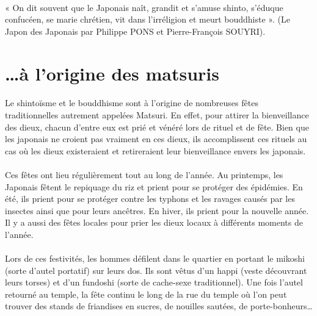 \paragraph{} « On dit souvent que le Japonais naît, grandit et s’amuse shinto,
s’éduque confucéen, se marie chrétien, vit dans l’irréligion et meurt
bouddhiste ». (Le Japon des Japonais par Philippe PONS et Pierre-François
SOUYRI).

\section{\ldots à l'origine des matsuris}

\paragraph{} Le shintoïsme et le bouddhisme sont à l’origine de nombreuses
fêtes traditionnelles autrement appelées Matsuri. En effet, pour attirer la
bienveillance des dieux, chacun d’entre eux est prié et vénéré lors de rituel
et de fête. Bien que les japonais ne croient pas vraiment en ces dieux, ils
accomplissent ces rituels au cas où les dieux existeraient et retireraient leur
bienveillance envers les japonais.

\paragraph{} Ces fêtes ont lieu régulièrement tout au long de l’année. Au
printemps, les Japonais fêtent le repiquage du riz et prient pour se protéger
des épidémies. En été, ils prient pour se protéger contre les typhons et les
ravages causés par les insectes ainsi que pour leurs ancêtres.  En hiver, ils
prient pour la nouvelle année. Il y a aussi des fêtes locales pour prier les
dieux locaux à différents moments de l’année.

\paragraph{} Lors de ces festivités, les hommes défilent dans le quartier en
portant le mikoshi (sorte d’autel portatif) sur leurs dos. Ils sont vêtus d’un
happi (veste découvrant leurs torses) et d’un fundoshi (sorte de cache-sexe
traditionnel). Une fois l’autel retourné au temple, la fête continu le long de
la rue du temple où l’on peut trouver des stands de friandises en sucres, de
nouilles sautées, de porte-bonheurs\ldots

